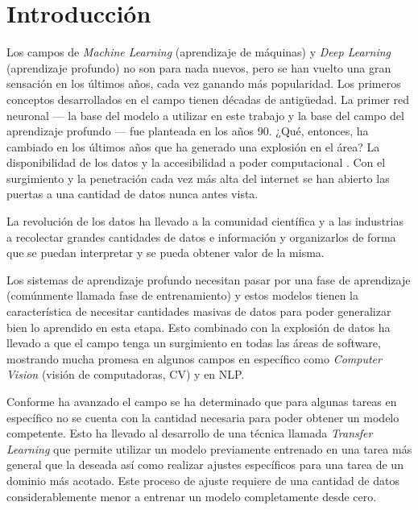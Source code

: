 
\section{Introducción}

Los campos de \emph{Machine Learning} (aprendizaje de máquinas) y \emph{Deep Learning} (aprendizaje profundo) \parencite{lecun2015deep} no son para nada nuevos, pero se han vuelto una gran sensación en los últimos años, cada vez ganando más popularidad. Los primeros conceptos desarrollados en el campo tienen décadas de antigüedad. La primer red neuronal --- la base del modelo a utilizar en este trabajo y la base del campo del aprendizaje profundo --- fue planteada en los años 90. ¿Qué, entonces, ha cambiado en los últimos años que ha generado una explosión en el área? La disponibilidad de los datos y la accesibilidad a poder computacional \parencite{jordan2015machine}. Con el surgimiento y la penetración cada vez más alta del internet se han abierto las puertas a una cantidad de datos nunca antes vista.

La revolución de los datos ha llevado a la comunidad científica y a las industrias a recolectar grandes cantidades de datos e información y organizarlos de forma que se puedan interpretar y se pueda obtener valor de la misma.

Los sistemas de aprendizaje profundo necesitan pasar por una fase de aprendizaje (comúnmente llamada fase de entrenamiento) y estos modelos tienen la característica de necesitar cantidades masivas de datos para poder generalizar bien lo aprendido en esta etapa. Esto combinado con la explosión de datos ha llevado a que el campo tenga un surgimiento en todas las áreas de software, mostrando mucha promesa en algunos campos en específico como \emph{Computer Vision} (visión de computadoras, CV) \parencite{hoo2016deep} y en NLP.

Conforme ha avanzado el campo se ha determinado que para algunas tareas en específico no se cuenta con la cantidad necesaria para poder obtener un modelo competente. Esto ha llevado al desarrollo de una técnica llamada \emph{Transfer Learning} que permite utilizar un modelo previamente entrenado en una tarea más general que la deseada así como realizar ajustes específicos para una tarea de un dominio más acotado. Este proceso de ajuste requiere de una cantidad de datos considerablemente menor a entrenar un modelo completamente desde cero.

